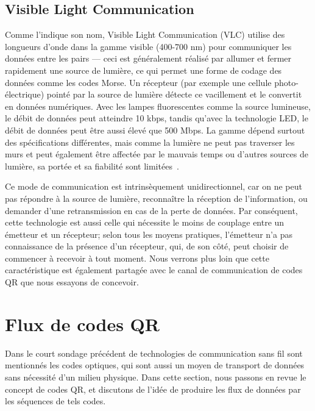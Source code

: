\subsection{Visible Light Communication}

Comme l'indique son nom, Visible Light Communication (VLC) \citep{komine2004fundamental} utilise des longueurs d'onde dans la gamme visible (400-700 nm) pour communiquer les données entre les pairs --- ceci est généralement réalisé par allumer et fermer rapidement une source de lumière, ce qui permet une forme de codage des données comme les codes Morse. Un récepteur (par exemple une cellule photo-électrique) pointé par la source de lumière détecte ce vacillement et le convertit en données numériques. Avec les lampes fluorescentes comme la source lumineuse, le débit de données peut atteindre 10 kbps, tandis qu'avec la technologie LED, le débit de données peut être aussi élevé que 500 Mbps. La gamme dépend surtout des spécifications différentes, mais comme la lumière ne peut pas traverser les murs et peut également être affectée par le mauvais temps ou d'autres sources de lumière, sa portée et sa fiabilité sont limitées~\citep{arnon2015visible}.

Ce mode de communication est intrinsèquement unidirectionnel, car on ne peut pas répondre à la source de lumière, reconnaître la réception de l'information, ou demander d'une retransmission en cas de la perte de données. Par conséquent, cette technologie est aussi celle qui nécessite le moins de couplage entre un émetteur et un récepteur; selon tous les moyens pratiques, l'émetteur n'a pas connaissance de la présence d'un récepteur, qui, de son côté, peut choisir de commencer à recevoir à tout moment. Nous verrons plus loin que cette caractéristique est également partagée avec le canal de communication de codes QR que nous essayons de concevoir.


\section{Flux de codes QR}\label{sec:qr:qrcode} %

Dans le court sondage précédent de technologies de communication sans fil sont mentionnés les codes optiques, qui sont aussi un moyen de transport de données sans nécessité d'un milieu physique. Dans cette section, nous passons en revue le concept de codes QR, et discutons de l'idée de produire les flux de données par les séquences de tels codes.

